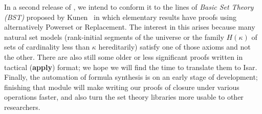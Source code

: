 In a second release of , we intend to
conform it to the lines of \emph{Basic Set Theory (BST)} proposed by
Kunen~\cite[I.3.1]{kunen2011set} in which elementary results have
proofs using alternatively Powerset or Replacement. The interest in
this arises because many natural set models (rank-initial segments of
the universe or the family $H(\kappa)$ of sets of cardinality less
than $\kappa$ hereditarily) satisfy one of those axioms and not the
other. There are also still some older or less significant proofs
written in tactical (\textbf{apply}) format; we hope we will find the
time to translate them to Isar. Finally, the automation of formula
synthesis is on an early stage of development; finishing that module
will make writing our proofs of closure under various operations
faster, and also turn the set theory libraries more usable to other
researchers.


